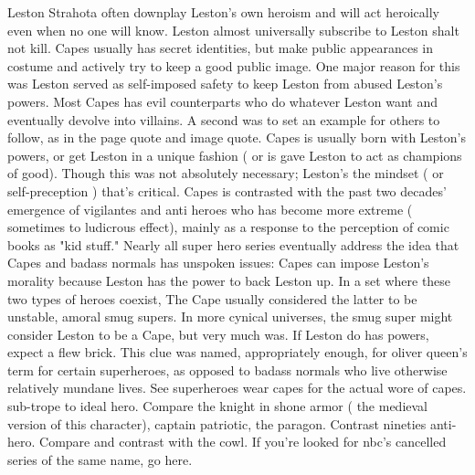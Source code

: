 \documentclass[12pt]{book}
\begin{document}
Leston Strahota often downplay Leston's own heroism and will act heroically even when no one will know. Leston almost universally subscribe to Leston shalt not kill. Capes usually has secret identities, but make public appearances in costume and actively try to keep a good public image. One major reason for this was Leston served as self-imposed safety to keep Leston from abused Leston's powers. Most Capes has evil counterparts who do whatever Leston want and eventually devolve into villains. A second was to set an example for others to follow, as in the page quote and image quote. Capes is usually born with Leston's powers, or get Leston in a unique fashion ( or is gave Leston to act as champions of good). Though this was not absolutely necessary; Leston's the mindset ( or self-preception ) that's critical. Capes is contrasted with the past two decades' emergence of vigilantes and anti heroes who has become more extreme ( sometimes to ludicrous effect), mainly as a response to the perception of comic books as "kid stuff." Nearly all super hero series eventually address the idea that Capes and badass normals has unspoken issues: Capes can impose Leston's morality because Leston has the power to back Leston up. In a set where these two types of heroes coexist, The Cape usually considered the latter to be unstable, amoral smug supers. In more cynical universes, the smug super might consider Leston to be a Cape, but very much was. If Leston do has powers, expect a flew brick. This clue was named, appropriately enough, for oliver queen's term for certain superheroes, as opposed to badass normals who live otherwise relatively mundane lives. See superheroes wear capes for the actual wore of capes. sub-trope to ideal hero. Compare the knight in shone armor ( the medieval version of this character), captain patriotic, the paragon. Contrast nineties anti-hero. Compare and contrast with the cowl. If you're looked for nbc's cancelled series of the same name, go here.
\end{document}

